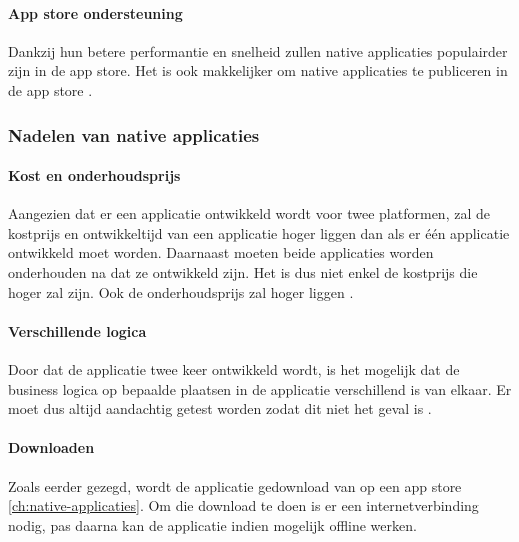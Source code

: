 \paragraph{App store ondersteuning}
Dankzij hun betere performantie en snelheid zullen native applicaties populairder zijn in de app store. 
Het is ook makkelijker om native applicaties te publiceren in de app store \autocite{Koffer2023}.

\subsubsection{Nadelen van native applicaties}
\paragraph{Kost en onderhoudsprijs}
Aangezien dat er een applicatie ontwikkeld wordt voor twee platformen, zal de kostprijs en 
ontwikkeltijd van een applicatie hoger liggen dan als er één applicatie ontwikkeld moet 
worden. Daarnaast moeten beide applicaties worden onderhouden na dat ze 
ontwikkeld zijn. Het is dus niet enkel de kostprijs die hoger zal zijn. Ook de onderhoudsprijs zal 
hoger liggen \autocite{AWS2023}. 

\paragraph{Verschillende logica}
Door dat de applicatie twee keer ontwikkeld wordt, is het mogelijk dat de business 
logica op bepaalde plaatsen in de applicatie verschillend is van elkaar. 
Er moet dus altijd aandachtig getest worden zodat dit niet het geval is \autocite{Kotlin2023}.

\paragraph{Downloaden}
Zoals eerder gezegd, wordt de applicatie gedownload van op een app store \ref{ch:native-applicaties}. 
Om die download te doen is er een internetverbinding nodig, 
pas daarna kan de applicatie indien mogelijk offline werken.

